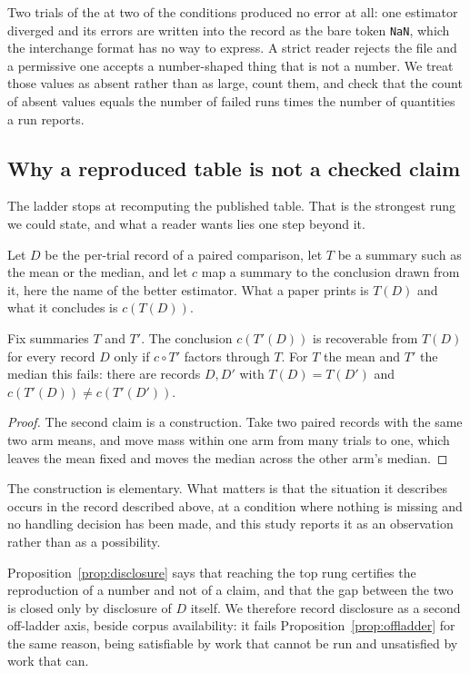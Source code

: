 Two trials of the \CxTrialsPerCondition{} at two of the conditions produced no
error at all: one estimator diverged and its errors are written into the record
as the bare token \texttt{NaN}, which the interchange format has no way to
express. A strict reader rejects the file and a permissive one accepts a
number-shaped thing that is not a number. We treat those values as absent rather
than as large, count them, and check that the count of absent values equals the
number of failed runs times the number of quantities a run reports.

\subsection{Why a reproduced table is not a checked claim}

The ladder stops at recomputing the published table. That is the strongest rung
we could state, and what a reader wants lies one step beyond it.

Let $D$ be the per-trial record of a paired comparison, let $T$ be a summary
such as the mean or the median, and let $c$ map a summary to the conclusion
drawn from it, here the name of the better estimator. What a paper prints is
$T(D)$ and what it concludes is $c(T(D))$.

\begin{proposition}\label{prop:disclosure}
Fix summaries $T$ and $T'$. The conclusion $c(T'(D))$ is recoverable from
$T(D)$ for every record $D$ only if $c \circ T'$ factors through $T$. For $T$
the mean and $T'$ the median this fails: there are records $D, D'$ with
$T(D) = T(D')$ and $c(T'(D)) \ne c(T'(D'))$.
\end{proposition}

\begin{proof}
The second claim is a construction. Take two paired records with the same two
arm means, and move mass within one arm from many trials to one, which leaves
the mean fixed and moves the median across the other arm's median.
\end{proof}

The construction is elementary. What matters is that the situation it describes
occurs in the record described above, at a condition where nothing is missing
and no handling decision has been made, and this study reports it as an
observation rather than as a possibility.

Proposition~\ref{prop:disclosure} says that reaching the top rung certifies the
reproduction of a number and not of a claim, and that the gap between the two is
closed only by disclosure of $D$ itself. We therefore record disclosure as a
second off-ladder axis, beside corpus availability: it fails
Proposition~\ref{prop:offladder} for the same reason, being satisfiable by work
that cannot be run and unsatisfied by work that can.

